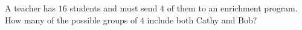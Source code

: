 A teacher has $16$ students and must send $4$ of them to an enrichment program. How many of the possible groups of $4$ include both Cathy and Bob?
